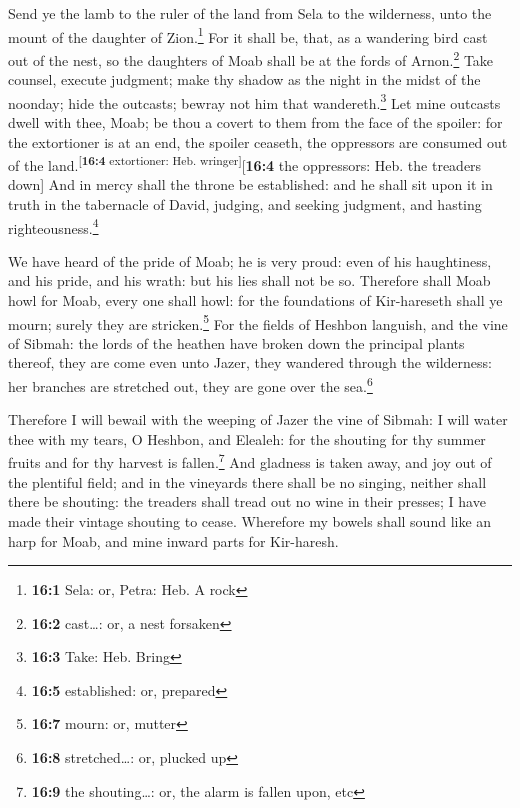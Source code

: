  Send ye the lamb to the ruler of the land from Sela to
the wilderness, unto the mount of the daughter of Zion.\footnote{\textbf{16:1}
  Sela: or, Petra: Heb. A rock}  For it shall be, that, as
a wandering bird cast out of the nest, so the daughters of Moab shall be
at the fords of Arnon.\footnote{\textbf{16:2} cast\ldots: or, a nest
  forsaken}  Take counsel, execute judgment; make thy
shadow as the night in the midst of the noonday; hide the outcasts;
bewray not him that wandereth.\footnote{\textbf{16:3} Take: Heb. Bring}
 Let mine outcasts dwell with thee, Moab; be thou a covert
to them from the face of the spoiler: for the extortioner is at an end,
the spoiler ceaseth, the oppressors are consumed out of the
land.\textsuperscript{{[}\textbf{16:4} extortioner: Heb.
wringer{]}}{[}\textbf{16:4} the oppressors: Heb. the treaders down{]}
 And in mercy shall the throne be established: and he
shall sit upon it in truth in the tabernacle of David, judging, and
seeking judgment, and hasting righteousness.\footnote{\textbf{16:5}
  established: or, prepared}

 We have heard of the pride of Moab; he is very proud:
even of his haughtiness, and his pride, and his wrath: but his lies
shall not be so.  Therefore shall Moab howl for Moab,
every one shall howl: for the foundations of Kir-hareseth shall ye
mourn; surely they are stricken.\footnote{\textbf{16:7} mourn: or,
  mutter}  For the fields of Heshbon languish, and the
vine of Sibmah: the lords of the heathen have broken down the principal
plants thereof, they are come even unto Jazer, they wandered through the
wilderness: her branches are stretched out, they are gone over the
sea.\footnote{\textbf{16:8} stretched\ldots: or, plucked up}

 Therefore I will bewail with the weeping of Jazer the
vine of Sibmah: I will water thee with my tears, O Heshbon, and Elealeh:
for the shouting for thy summer fruits and for thy harvest is
fallen.\footnote{\textbf{16:9} the shouting\ldots: or, the alarm is
  fallen upon, etc}  And gladness is taken away, and joy
out of the plentiful field; and in the vineyards there shall be no
singing, neither shall there be shouting: the treaders shall tread out
no wine in their presses; I have made their vintage shouting to cease.
 Wherefore my bowels shall sound like an harp for Moab,
and mine inward parts for Kir-haresh.

